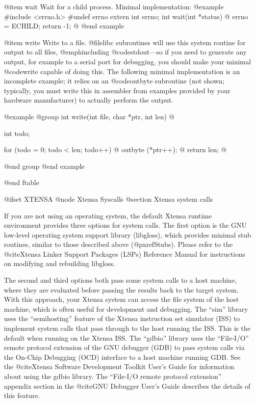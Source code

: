 @item wait
Wait for a child process.  Minimal implementation:
@example
#include <errno.h>
#undef errno
extern int errno;
int wait(int *status) @{
  errno = ECHILD;
  return -1;
@}
@end example

@item write
Write to a file.  @file{libc} subroutines will use this
system routine for output to all files, @emph{including}
@code{stdout}---so if you need to generate any output, for example to a
serial port for debugging, you should make your minimal @code{write}
capable of doing this.  The following minimal implementation is an
incomplete example; it relies on an @code{outbyte} subroutine (not
shown; typically, you must write this in assembler from examples
provided by your hardware manufacturer) to actually perform the output.

@example
@group
int write(int file, char *ptr, int len) @{
  int todo;

  for (todo = 0; todo < len; todo++) @{
    outbyte (*ptr++);
  @}
  return len;
@}
@end group
@end example

@end ftable

@ifset XTENSA
@node Xtensa Syscalls
@section Xtensa system calls

If you are not using an operating system, the default Xtensa runtime
environment provides three options for system calls.  The first option
is the GNU low-level operating system support library (libgloss),
which provides minimal stub routines, similar to those described above
(@pxref{Stubs}).  Please refer to the @cite{Xtensa Linker Support
Packages (LSPs) Reference Manual} for instructions on modifying and
rebuilding libgloss.

The second and third options both pass some system calls to a host machine,
where they are evaluated before passing the results back to the target
system.  With this approach, your Xtensa system can access the file system
of the host machine, which is often useful for development and debugging.
The ``sim'' library uses the ``semihosting'' feature of the Xtensa
instruction set simulator (ISS) to implement system calls that pass through
to the host running the ISS.  This is the default when running on the
Xtensa ISS.  The ``gdbio'' library uses the ``File-I/O'' remote protocol
extension of the GNU debugger (GDB) to pass system calls via the On-Chip
Debugging (OCD)
interface to a host machine running GDB.  See the @cite{Xtensa Software
Development Toolkit User's Guide} for information about using the gdbio
library.  The ``File-I/O remote protocol extension'' appendix section in the
@cite{GNU Debugger User's Guide} describes the details of this feature.

